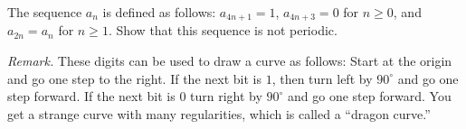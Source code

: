 The sequence $a_n$ is defined as follows: $a_{4n+1} = 1$, $a_{4n+3} = 0$ for $n \geq 0$, and $a_{2n} = a_n$ for $n \geq 1$. Show that this sequence is not periodic.

\emph{Remark.} These digits can be used to draw a curve as follows: Start at the origin and go one step to the right. If the next bit is $1$, then turn left by $90^\circ$ and go one step forward. If the next bit is $0$ turn right by $90^\circ$ and go one step forward. You get a strange curve with many regularities, which is called a ``dragon curve.''
